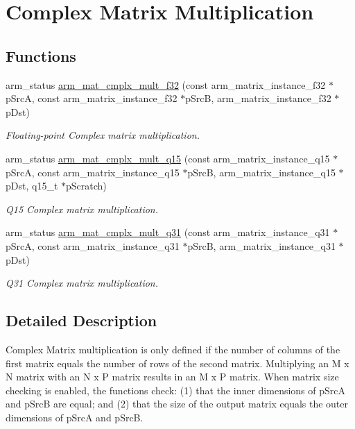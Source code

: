 \hypertarget{group__CmplxMatrixMult}{}\section{Complex Matrix Multiplication}
\label{group__CmplxMatrixMult}
\subsection*{Functions}
\begin{DoxyCompactItemize}
\item 
arm\+\_\+status \hyperlink{group__CmplxMatrixMult_ga1adb839ac84445b8c2f04efa43faef35}{arm\+\_\+mat\+\_\+cmplx\+\_\+mult\+\_\+f32} (const arm\+\_\+matrix\+\_\+instance\+\_\+f32 $\ast$p\+SrcA, const arm\+\_\+matrix\+\_\+instance\+\_\+f32 $\ast$p\+SrcB, arm\+\_\+matrix\+\_\+instance\+\_\+f32 $\ast$p\+Dst)
\begin{DoxyCompactList}\small\item\em Floating-\/point Complex matrix multiplication. \end{DoxyCompactList}\item 
arm\+\_\+status \hyperlink{group__CmplxMatrixMult_ga63066615e7d6f6a44f4358725092419e}{arm\+\_\+mat\+\_\+cmplx\+\_\+mult\+\_\+q15} (const arm\+\_\+matrix\+\_\+instance\+\_\+q15 $\ast$p\+SrcA, const arm\+\_\+matrix\+\_\+instance\+\_\+q15 $\ast$p\+SrcB, arm\+\_\+matrix\+\_\+instance\+\_\+q15 $\ast$p\+Dst, q15\+\_\+t $\ast$p\+Scratch)
\begin{DoxyCompactList}\small\item\em Q15 Complex matrix multiplication. \end{DoxyCompactList}\item 
arm\+\_\+status \hyperlink{group__CmplxMatrixMult_gaaf3c0b171ca8412c77bab9fa90804737}{arm\+\_\+mat\+\_\+cmplx\+\_\+mult\+\_\+q31} (const arm\+\_\+matrix\+\_\+instance\+\_\+q31 $\ast$p\+SrcA, const arm\+\_\+matrix\+\_\+instance\+\_\+q31 $\ast$p\+SrcB, arm\+\_\+matrix\+\_\+instance\+\_\+q31 $\ast$p\+Dst)
\begin{DoxyCompactList}\small\item\em Q31 Complex matrix multiplication. \end{DoxyCompactList}\end{DoxyCompactItemize}


\subsection{Detailed Description}
Complex Matrix multiplication is only defined if the number of columns of the first matrix equals the number of rows of the second matrix. Multiplying an {\ttfamily M x N} matrix with an {\ttfamily N x P} matrix results in an {\ttfamily M x P} matrix. When matrix size checking is enabled, the functions check\+: (1) that the inner dimensions of {\ttfamily p\+SrcA} and {\ttfamily p\+SrcB} are equal; and (2) that the size of the output matrix equals the outer dimensions of {\ttfamily p\+SrcA} and {\ttfamily p\+SrcB}. 

